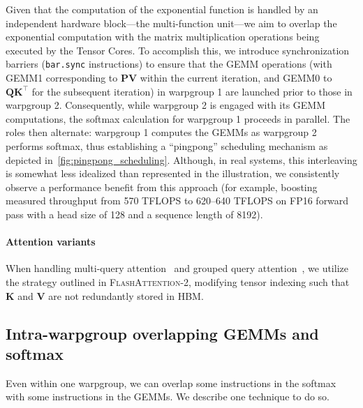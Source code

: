 \begin{enumerate}
Given that the computation of the exponential function is handled by an independent hardware block—the multi-function unit—we aim to overlap the exponential computation with the matrix multiplication operations being executed by the Tensor Cores. To accomplish this, we introduce synchronization barriers (\texttt{bar.sync} instructions) to ensure that the GEMM operations (with GEMM1 corresponding to $\mathbf{P} \mathbf{V}$ within the current iteration, and GEMM0 to $\mathbf{Q} \mathbf{K}^\top$ for the subsequent iteration) in warpgroup 1 are launched prior to those in warpgroup 2. Consequently, while warpgroup 2 is engaged with its GEMM computations, the softmax calculation for warpgroup 1 proceeds in parallel. The roles then alternate: warpgroup 1 computes the GEMMs as warpgroup 2 performs softmax, thus establishing a “pingpong” scheduling mechanism as depicted in~\cref{fig:pingpong_scheduling}. Although, in real systems, this interleaving is somewhat less idealized than represented in the illustration, we consistently observe a performance benefit from this approach (for example, boosting measured throughput from 570 TFLOPS to 620–640 TFLOPS on FP16 forward pass with a head size of 128 and a sequence length of 8192).

\paragraph{Attention variants} When handling multi-query attention~\citep{shazeer2019fast} and grouped query attention~\citep{ainslie2023gqa}, we utilize the strategy outlined in \textsc{FlashAttention-2}, modifying tensor indexing such that $\mathbf{K}$ and $\mathbf{V}$ are not redundantly stored in HBM.

\subsection{Intra-warpgroup overlapping GEMMs and softmax}

Even within one warpgroup, we can overlap some instructions in the softmax with some instructions in the GEMMs. We describe one technique to do so.


\end{enumerate}

